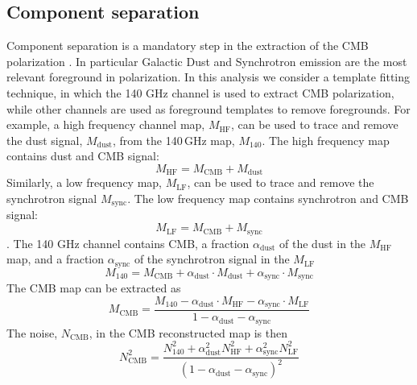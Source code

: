 \subsection{Component separation}
Component separation is a mandatory step in the extraction of the CMB polarization 
\citep[see e.g.][]{buzzelli_migliaccio2018}. In particular Galactic Dust and Synchrotron 
emission are the most relevant foreground in polarization. 
In this analysis we consider a template fitting technique, in which the 140 GHz channel
is used to extract CMB polarization, while other channels are used as 
foreground templates to remove foregrounds.
For example, a high frequency channel map, $M_\text{HF}$, can be used 
to trace and remove the dust signal, $M_\text{dust}$, from the 
140\,GHz map, $M_\text{140}$.
The high frequency map contains dust and CMB signal:
\begin{equation} 
M_\text{HF} = M_\text{CMB} + M_\text{dust}
\end{equation}
Similarly, a low frequency map, $M_\text{LF}$, can be used to 
trace and remove the synchrotron signal $M_\text{sync}$. 
The low frequency map contains synchrotron and CMB signal:
\begin{equation} 
M_\text{LF} = M_\text{CMB} + M_\text{sync}
\end{equation}.
The 140 GHz channel contains CMB, a fraction $\alpha_\text{dust}$ of
the dust in the $M_\text{HF}$ map, and a fraction $\alpha_\text{sync}$ of
the synchrotron signal in the $M_\text{LF}$ 
\begin{equation} 
M_\text{140} = M_\text{CMB} + 
\alpha_\text{dust} \cdot M_\text{dust} +
\alpha_\text{sync} \cdot M_\text{sync}
\end{equation}
The CMB map can be extracted as
\begin{equation} 
M_\text{CMB} = \frac{M_\text{140} - 
\alpha_\text{dust} \cdot M_\text{HF} - 
\alpha_\text{sync} \cdot M_\text{LF}
}{1-\alpha_\text{dust}-\alpha_\text{sync}}
\end{equation}
The noise, $N_\text{CMB}$, in the CMB reconstructed map is then
\begin{equation}
N_\text{CMB}^2 = 
\frac{N_{140}^2 +
\alpha_\text{dust}^2 N^2_\text{HF} +
\alpha_\text{sync}^2 N^2_\text{LF} 
}
{(1-\alpha_\text{dust}-\alpha_\text{sync})^2}
\end{equation}
